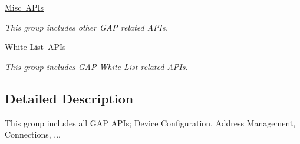 \begin{DoxyCompactItemize}
\mbox{\hyperlink{group__gap__misc__group}{Misc A\+P\+Is}}
\begin{DoxyCompactList}\small\item\em This group includes other G\+AP related A\+P\+Is. \end{DoxyCompactList}\item 
\mbox{\hyperlink{group__gap__whitelist__group}{White-\/\+List A\+P\+Is}}
\begin{DoxyCompactList}\small\item\em This group includes G\+AP White-\/\+List related A\+P\+Is. \end{DoxyCompactList}\end{DoxyCompactItemize}


\subsection{Detailed Description}
This group includes all G\+AP A\+P\+Is; Device Configuration, Address Management, Connections, ... 

